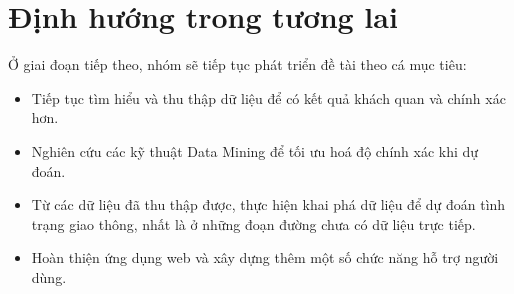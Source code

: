 \section{Định hướng trong tương lai}
Ở giai đoạn tiếp theo, nhóm sẽ tiếp tục phát triển đề tài theo cá mục tiêu:
\begin{itemize}
    \item Tiếp tục tìm hiểu và thu thập dữ liệu để có kết quả khách quan và chính xác hơn.
    \item Nghiên cứu các kỹ thuật Data Mining để tối ưu hoá độ chính xác khi dự đoán.
    \item Từ các dữ liệu đã thu thập được, thực hiện khai phá dữ liệu để dự đoán tình trạng giao thông, nhất là ở những đoạn đường chưa có dữ liệu trực tiếp.
    \item Hoàn thiện ứng dụng web và xây dựng thêm một số chức năng hỗ trợ người dùng.
\end{itemize}